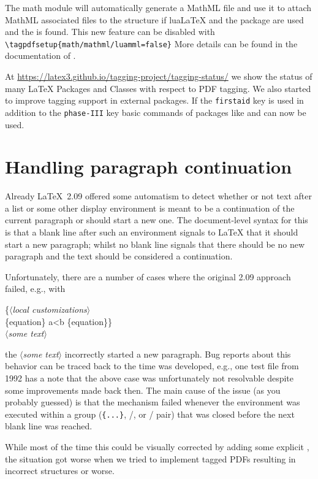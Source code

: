 \documentclass{ltnews}
\providecommand\meta[1]{$\langle$\textrm{\itshape#1}$\rangle$}
\begin{document}
The math module will automatically generate a MathML file and use it to 
attach MathML associated files to the structure if lua\LaTeX{} and 
the  package are used and the  is found.
This new feature can be disabled with \verb+\tagpdfsetup{math/mathml/luamml=false}+ 
More details can be found in the documentation of . 

At \url{https://latex3.github.io/tagging-project/tagging-status/} we show the status of many \LaTeX{} Packages and Classes with respect to PDF tagging. 
We also started to improve tagging support in external packages. If the 
\texttt{firstaid} key is used in addition to the \texttt{phase-III} key
basic commands of packages like  and  can now be used. 

\section{Handling paragraph continuation}

Already \LaTeX~2.09 offered some automatism to detect whether or not
text after a list or some other display environment is meant to be a
continuation of the current paragraph or should start a new one.  The
document-level syntax for this is that a blank line after such an
environment signals to \LaTeX{} that it should start a new paragraph; whilst
no blank line signals that there should be no new paragraph and the
text should be considered a continuation.

Unfortunately, there are a number of cases where the original 2.09
approach failed, e.g., with
\begin{flushleft}
  \ttfamily
\{\meta{local customizations}\\
\{equation\} a<b \{equation\}\} \\
\meta{some text}
\end{flushleft}
the \meta{some text} incorrectly started a new paragraph.  Bug reports
about this behavior can be traced back to the time \LaTeXe{} was
developed, e.g., one test file from 1992 has a note that the above
case was unfortunately not resolvable despite some improvements made back
then.  The main cause of the issue (as you probably guessed) is that
the mechanism failed whenever the environment was executed within a
group (\texttt{\{...\}}, /, or
/ pair) that was closed before the next blank
line was reached.

While most of the time  this could be visually corrected by adding some
explicit , the situation got worse when we tried to
implement tagged PDFs resulting in incorrect structures or worse.
\end{document}
